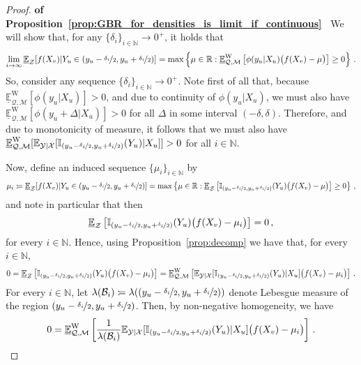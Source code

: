 \documentclass[twoside,11pt]{article}
\newcommand{\nats}{\mathbb{N}}
\newcommand{\reals}{\mathbb{R}}
\newcommand{\states}{\mathcal{X}}
\newcommand{\observs}{\mathcal{Y}}
\newcommand{\lexp}{\underline{\mathbb{E}}_{\rateset,\mathcal{M}}^\mathrm{W}}
\newcommand{\ind}[1]{\mathbb{I}_{#1}}
\newcommand{\rateset}{\mathcal{Q}}
\newcommand{\coloneqq}{:\!=}
\begin{document}
\begin{proof}{\bf of Proposition~\ref{prop:GBR_for_densities_is_limit_if_continuous}~}
We will show that, for any $\{\delta_i\}_{i\in\nats}\to 0^+$, it holds that
\begin{equation*}
\lim_{i\to \infty}\underline{\mathbb{E}}_\mathcal{Z}[f(X_v)\vert Y_u\in (y_u-\nicefrac{\delta_i}{2},y_u+\nicefrac{\delta_i}{2})] = \max\left\{ \mu\in\reals : \lexp\left[ \phi(y_u\vert X_u)\bigl(f(X_v) -\mu \bigr)\right] \geq 0\right\}\,.
\end{equation*}
So, consider any sequence $\{\delta_i\}_{i\in\nats}\to 0^+$. Note first of all that, because $\lexp[\phi(y_u\vert X_u)]>0$, and due to continuity of $\phi(y_u\vert X_u)$, we must also have $\lexp[\phi(y_u + \Delta \vert X_u)]>0$ for all $\Delta$ in some interval $(-\delta,\delta)$. Therefore, and due to monotonicity of measure, it follows that we must also have $\lexp[\mathbb{E}_{\observs\vert\states}[\ind{(y_u-\nicefrac{\delta_i}{2},y_u+\nicefrac{\delta_i}{2})}(Y_u)\vert X_u]]>0$ for all $i\in\nats$.

Now, define an induced sequence $\{\mu_i\}_{i\in\nats}$ by
\begin{equation*}
\mu_i \coloneqq \underline{\mathbb{E}}_{\mathcal{Z}}[f(X_v)\vert Y_u\in (y_u-\nicefrac{\delta_i}{2},y_u+\nicefrac{\delta_i}{2})] = \max\left\{ \mu\in\reals : \underline{\mathbb{E}}_{\mathcal{Z}}\left[ \ind{(y_u-\nicefrac{\delta_i}{2},y_u+\nicefrac{\delta_i}{2})}(Y_u)\bigl( f(X_v) - \mu \bigr) \right] \geq 0\right\}\,,
\end{equation*}
and note in particular that then
\begin{equation*}
\underline{\mathbb{E}}_{\mathcal{Z}}\left[ \ind{(y_u-\nicefrac{\delta_i}{2},y_u+\nicefrac{\delta_i}{2})}(Y_u)\bigl( f(X_v) - \mu_i \bigr) \right] = 0\,,
\end{equation*}
for every $i\in\nats$. Hence, using Proposition~\ref{prop:decomp} we have that, for every $i\in\nats$,
\begin{equation*}
0 = \underline{\mathbb{E}}_{\mathcal{Z}}\left[ \ind{(y_u-\nicefrac{\delta_i}{2},y_u+\nicefrac{\delta_i}{2})}(Y_u)\bigl( f(X_v) - \mu_i \bigr) \right] = \lexp\left[ \mathbb{E}_{\observs\vert\states}[\ind{(y_u-\nicefrac{\delta_i}{2},y_u+\nicefrac{\delta_i}{2})}(Y_u)\vert X_u]\bigl( f(X_v) - \mu_i \bigr) \right]\,.
\end{equation*}
For every $i\in\nats$, let $\lambda(\mathcal{B}_i)\coloneqq \lambda((y_u-\nicefrac{\delta_i}{2},y_u+\nicefrac{\delta_i}{2}))$ denote Lebesgue measure of the region $(y_u-\nicefrac{\delta_i}{2},y_u+\nicefrac{\delta_i}{2})$.
Then, by non-negative homogeneity, we have
\begin{equation}\label{eq:all_steps_zero}
0 = \lexp\left[\frac{1}{\lambda(\mathcal{B}_i)} \mathbb{E}_{\observs\vert\states}[\ind{(y_u-\nicefrac{\delta_i}{2},y_u+\nicefrac{\delta_i}{2})}(Y_u)\vert X_u]\bigl( f(X_v) - \mu_i \bigr) \right]\,.
\end{equation}


\end{proof}
\end{document}
